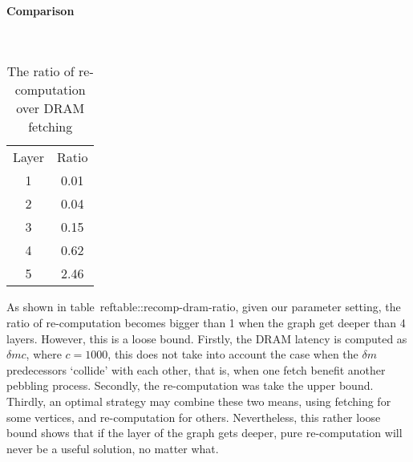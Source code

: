 \documentclass[a4paper, oneside]{article}
\begin{document}
\paragraph{Comparison}
\begin{table}
  \centering
  \begin{tabular}{|c|c|}
     \hline
     Layer & Ratio \hline\\
     1 & 0.01 \\
     2 & 0.04 \\
     3 & 0.15 \\
     4 & 0.62 \\
     5 & 2.46 \\
     \hline
   \end{tabular}
  \caption{The ratio of re-computation over DRAM fetching}\label{table::recomp-dram-ratio}
\end{table}

As shown in table~ref{table::recomp-dram-ratio}, given our parameter setting, the ratio of re-computation becomes bigger than 1 when the graph get deeper than 4 layers.
However, this is a loose bound. Firstly, the DRAM latency is computed as $\delta mc$, where $c = 1000$, this does not take into account the case when the $\delta m$ 
predecessors `collide' with each other, that is, when one fetch benefit another pebbling process. Secondly, the re-computation was take the upper bound. Thirdly, an
optimal strategy may combine these two means, using fetching for some vertices, and re-computation for others. Nevertheless, this rather loose bound shows that if
the layer of the graph gets deeper, pure re-computation will never be a useful solution, no matter what.



\end{document}
